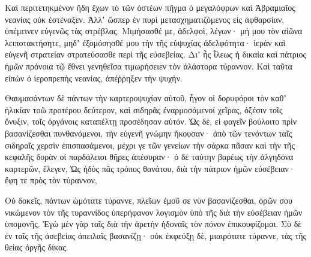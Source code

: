 {\par }{\PP {}Καὶ περιτετηκμένον ἤδη ἔχων τὸ τῶν ὀστέων πῆγμα ὁ μεγαλόφρων καὶ Ἀβραμιαῖος νεανίας οὐκ ἐστέναξεν.
Ἀλλʼ ὥσπερ ἐν πυρὶ μετασχηματιζόμενος εἰς ἀφθαρσίαν, ὑπέμεινεν εὐγενῶς τὰς στρέβλας.
Μιμήσασθέ με, ἀδελφοὶ, λέγων· μή μου τὸν αἰῶνα λειποτακτήσητε, μηδʼ ἐξομόσησθέ μου τὴν τῆς εὐψυχίας ἀδελφότητα· ἱερὰν καὶ εὐγενῆ στρατείαν στρατεύσασθε περὶ τῆς εὐσεβείας.
Διʼ ἧς ἷλεως ἡ δικαία καὶ πάτριος ἡμῶν πρόνοια τῷ ἔθνει γενηθεῖσα τιμωρήσειεν τὸν ἀλάστορα τύραννον.
Καὶ ταῦτα εἰπὼν ὁ ἱεροπρεπὴς νεανίας, ἀπέῤῥηξεν τὴν ψυχήν.
\par }{\PP {}Θαυμασάντων δὲ πάντων τὴν καρτεροψυχίαν αὐτοῦ, ἦγον οἱ δορυφόροι τὸν καθʼ ἡλικίαν τοῶ προτέρου δεύτερον, καὶ σιδηρᾶς ἐναρμοσάμενοί χεῖρας, ὀξέσιν τοῖς ὄνυξιν, τοῖς ὀργάνοις καταπέλτῃ προσέδησαν αὐτόν.
Ὡς δὲ, εἰ φαγεῖν βούλοιτο πρὶν βασανίζεσθαι πυνθανόμενοι, τὴν εὐγενῆ γνώμην ἤκουσαν·
ἀπὸ τῶν τενόντων ταῖς σιδηραῖς χερσὶν ἐπισπασάμενοι, μέχρι γε τῶν γενείων τὴν σάρκα πᾶσαν καὶ τὴν τῆς κεφαλῆς δορὰν οἱ παρδάλειοι θῆρες ἀπέσυραν· ὁ δὲ ταύτην βαρέως τὴν ἀλγηδόνα καρτερῶν, ἔλεγεν,
Ὡς ἡδὺς πᾶς τρόπος θανάτου, διὰ τὴν πάτριον ἡμῶν εὐσέβειαν· ἔφη τε πρὸς τὸν τύραννον,
\par }{\PP {}Οὐ δοκεῖς, πάντων ὠμότατε τύραννε, πλεῖων ἐμοῦ σε νὺν βασανίζεσθαι, ὁρῶν σου νικώμενον τὸν τῆς τυραννίδος ὑπερήφανον λογισμὸν ὑπὸ τῆς διὰ τὴν εὐσέβειαν ἡμῶν ὑπομονῆς.
Ἐγὼ μὲν γὰρ ταῖς διὰ τὴν ἀρετὴν ἡδοναῖς τὸν πόνον ἐπικουφίζομαι.
Σὺ δὲ ἐν ταῖς τῆς ἀσεβείας ἀπειλαῖς βασανίζῃ· οὐκ ἐκφεύξῃ δὲ, μιαιρότατε τύραννε, τὰς τῆς θείας ὀργῆς δίκας.

}

